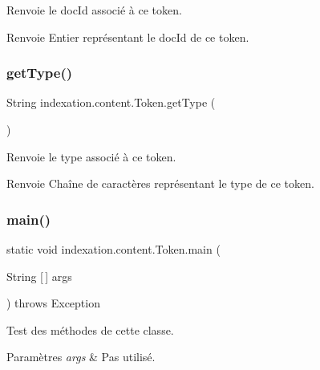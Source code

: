 Renvoie le doc\+Id associé à ce token.

\begin{DoxyReturn}{Renvoie}
Entier représentant le doc\+Id de ce token. 
\end{DoxyReturn}
\mbox{\label{classindexation_1_1content_1_1Token_ab0814c24d102e076c026a2adf23aeb30}} 
\subsubsection{\texorpdfstring{get\+Type()}{getType()}}
{\footnotesize\ttfamily String indexation.\+content.\+Token.\+get\+Type (\begin{DoxyParamCaption}{ }\end{DoxyParamCaption})}

Renvoie le type associé à ce token.

\begin{DoxyReturn}{Renvoie}
Chaîne de caractères représentant le type de ce token. 
\end{DoxyReturn}
\mbox{\label{classindexation_1_1content_1_1Token_aa26f4b5926b907410512e7d6925f8b27}} 
\subsubsection{\texorpdfstring{main()}{main()}}
{\footnotesize\ttfamily static void indexation.\+content.\+Token.\+main (\begin{DoxyParamCaption}\item[{String \mbox{[}$\,$\mbox{]}}]{args }\end{DoxyParamCaption}) throws Exception\hspace{0.3cm}{\ttfamily [static]}}

Test des méthodes de cette classe.


\begin{DoxyParams}{Paramètres}
{\em args} & Pas utilisé.\\
\hline
\end{DoxyParams}

